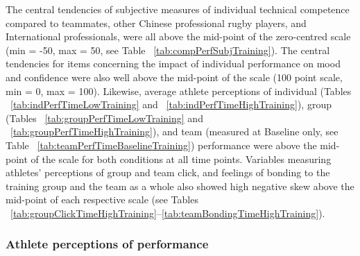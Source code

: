 \documentclass[english]{article}\usepackage[]{graphicx}\usepackage[]{color}
\begin{document}
The central tendencies of subjective measures of individual technical competence compared to teammates, other Chinese professional rugby players, and International professionals, were all above the mid-point of the zero-centred scale (min = -50, max = 50, see Table ~\ref{tab:compPerfSubjTraining}).  The central tendencies for items concerning the impact of individual performance on mood and confidence were also well above the mid-point of the scale (100 point scale, min = 0, max = 100). Likewise, average athlete perceptions of individual (Tables ~\ref{tab:indPerfTimeLowTraining} and ~\ref{tab:indPerfTimeHighTraining}), group (Tables ~\ref{tab:groupPerfTimeLowTraining} and ~\ref{tab:groupPerfTimeHighTraining}), and team (measured at Baseline only, see Table ~\ref{tab:teamPerfTimeBaselineTraining}) performance were above the mid-point of the scale for both conditions at all time points.
Variables measuring athletes' perceptions of group and team click, and feelings of bonding to the training group and the team as a whole also showed high negative skew above the mid-point of each respective scale (see Tables ~\ref{tab:groupClickTimeHighTraining}\nobreakdash--\ref{tab:teamBondingTimeHighTraining}).



%
%
%
%
%
%
%
%
%
%
%
%
%
%
%



\subsubsection{Athlete perceptions of performance}
\end{document}
